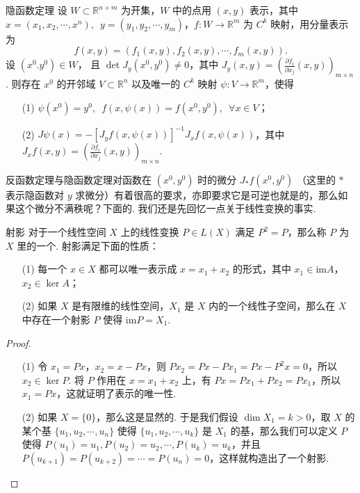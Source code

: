 \begin{theorem}{隐函数定理}{}
    设 $W\subset \mathbb{R}^{n+m}$ 为开集，$W$ 中的点用 $(x, y)$ 表示，其中 $x = (x_1, x_2, \cdots, x^n), \enspace y = (y_1, y_2, \cdots, y_m)$，$f:W\to \mathbb{R}^m$ 为 $C^k$ 映射，用分量表示为 \[f(x, y) = (f_1(x, y), f_2(x, y), \cdots, f_m(x, y)).\]
    设 $(x^0. y^0)\in W$， 且 $\det J_y(x^0, y^0)\neq 0$，其中 $J_y(x, y) = \left(\frac{\partial f_i}{\partial x_j}(x, y)\right)_{m\times n}$. 则存在 $x^0$ 的开邻域 $V\subset \mathbb{R}^n$ 以及唯一的 $C^k$ 映射 $\psi: V\to \mathbb{R}^m$，使得\begin{enumerate}
        \item[(1)] $\psi(x^0) = y^0,\enspace f(x, \psi(x)) = f(x^0, y^0),\enspace \forall x\in V$；
        \item[(2)] $J\psi(x) = -[J_yf(x, \psi(x))]^{-1}J_xf(x, \psi(x))$，其中 $J_xf(x, y) = \left(\frac{\partial f_i}{\partial x_j}(x, y)\right)_{m\times n}$.
    \end{enumerate}
\end{theorem}

反函数定理与隐函数定理对函数在 $(x^0, y^0)$ 时的微分 $J_*f(x^0, y^0)$ （这里的 $*$ 表示隐函数对 $y$ 求微分）有着很高的要求，亦即要求它是可逆也就是的，那么如果这个微分不满秩呢？下面的. 我们还是先回忆一点关于线性变换的事实.

\begin{theorem}{射影}{}
    对于一个线性空间 $X$ 上的线性变换 $P\in L(X)$ 满足 $P^2 = P$，那么称 $P$ 为 $X$ 里的一个. 射影满足下面的性质：
    \begin{enumerate}
        \item[(1)] 每一个 $x\in X$ 都可以唯一表示成 $x = x_1+x_2$ 的形式，其中 $x_1\in\mathrm{im}A$，$x_2\in\ker A$；
        \item[(2)] 如果 $X$ 是有限维的线性空间，$X_1$ 是 $X$ 内的一个线性子空间，那么在 $X$ 中存在一个射影 $P$ 使得 $\mathrm{im}P = X_1$.
    \end{enumerate}
\end{theorem}

\begin{proof}
    \begin{enumerate}
        \item[(1)] 令 $x_1 = Px$，$x_2 = x - Px$，则 $Px_2 = Px - Px_1 = Px - P^2x = 0$，所以 $x_2\in\ker P$. 将 $P$ 作用在 $x = x_1 + x_2$ 上，有 $Px = Px_1 + Px_2 = Px_1$，所以 $x_1 = Px$，这就证明了表示的唯一性.
        \item[(2)]  如果 $X = \{0\}$，那么这是显然的. 于是我们假设 $\dim X_1 = k >0$，取 $X$ 的某个基 $\{u_1, u_2, \cdots, u_n\}$ 使得 $\{u_1, u_2, \cdots, u_k\}$ 是 $X_1$ 的基，那么我们可以定义 $P$ 使得 $P(u_1) = u_1, P(u_2) = u_2, \cdots, P(u_k) = u_k$，并且 $P(u_{k+1}) = P(u_{k+2}) = \cdots = P(u_n) = 0$，这样就构造出了一个射影.
    \end{enumerate}
\end{proof}

